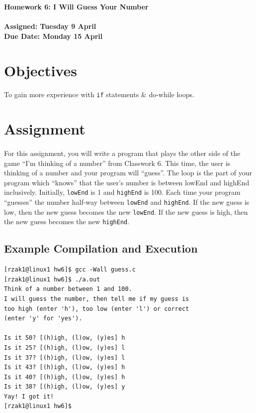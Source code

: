 \documentclass[letter,11pt]{article}
\begin{document}
\huge
\textbf{Homework 6: I Will Guess Your Number}
\normalsize
\\ ~~ \\
\textbf{Assigned: Tuesday 9 April} \\
\textbf{Due Date: Monday 15 April}

\section*{Objectives}
\paragraph{}To gain more experience with \texttt{if} statements \& do-while loops.

\FloatBarrier
\section*{Assignment}
\paragraph{}For this assignment, you will write a program that plays the other side of the game ``I'm thinking of a number'' from Classwork 6. This time, the user is thinking of a number and your program will ``guess''. The loop is the part of your program which ``knows'' that the user's number is between lowEnd and highEnd inclusively. Initially, \texttt{lowEnd} is 1 and \texttt{highEnd} is 100. Each time your program ``guesses'' the number half-way between \texttt{lowEnd} and \texttt{highEnd}. If the new guess is low, then the new guess becomes the new \texttt{lowEnd}. If the new guess is high, then the new guess becomes the new \texttt{highEnd}.

\subsection*{Example Compilation and Execution}
\begin{verbatim}
[rzak1@linux1 hw6]$ gcc -Wall guess.c
[rzak1@linux1 hw6]$ ./a.out
Think of a number between 1 and 100.
I will guess the number, then tell me if my guess is
too high (enter 'h'), too low (enter 'l') or correct
(enter 'y' for 'yes').

Is it 50? [(h)igh, (l)ow, (y)es] h
Is it 25? [(h)igh, (l)ow, (y)es] l
Is it 37? [(h)igh, (l)ow, (y)es] l
Is it 43? [(h)igh, (l)ow, (y)es] h
Is it 40? [(h)igh, (l)ow, (y)es] h
Is it 38? [(h)igh, (l)ow, (y)es] y
Yay! I got it!
[rzak1@linux1 hw6]$ 
\end{verbatim}
\end{document}
